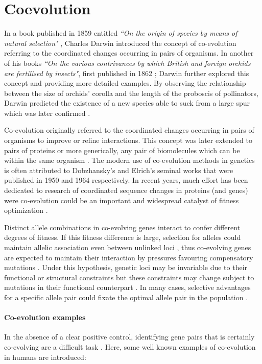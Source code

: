 \section{Coevolution}

In a book published in 1859 entitled \textit{``On the origin of species by means of natural selection"} \cite{darwin1859origin}, Charles Darwin introduced the concept of co-evolution referring to the coordinated changes occurring in pairs of organisms.
In another of his books \textit{``On the various contrivances by which British and foreign orchids are fertilised by insects"}, first published in 1862  \cite{darwin1877various}; Darwin further explored this concept and providing more detailed examples.
By observing the relationship between the size of orchids' corolla and the length of the proboscis of pollinators, Darwin predicted the existence of a new species able to suck from a large spur  which was later confirmed \cite{de2013emerging}.

Co‐evolution originally referred to the coordinated changes occurring in pairs of organisms to improve or refine interactions.
This concept was later extended to pairs of proteins or more generically, any pair of biomolecules which can be within the same organism \cite{de2013emerging}.
The modern use of co-evolution methods in genetics is often attributed to Dobzhansky's \cite{dobzhansky1950genetics} and Elrich's \cite{ehrlich1964butterflies} seminal works that were published in 1950 and 1964 respectively.
In recent years, much effort has been dedicated to research of coordinated sequence changes in proteins (and genes) were co‐evolution could be an important and widespread catalyst of fitness optimization \cite{de2013emerging}.

Distinct allele combinations in co-evolving genes interact to confer different degrees of fitness. 
If this fitness difference is large, selection for alleles could maintain allelic association even between unlinked loci \cite{rohlfs2010detecting}, thus co-evolving genes are expected to maintain their interaction by pressures favouring compensatory mutations \cite{rohlfs2010detecting}.
Under this hypothesis, genetic loci may be invariable due to their functional or structural constraints but these constraints may change subject to mutations in their functional counterpart \cite{fares2006novel}.
In many cases, selective advantages for a specific allele pair could fixate the optimal allele pair in the population \cite{rohlfs2010detecting}.

\paragraph{Co-evolution examples}
In the absence of a clear positive control, identifying gene pairs that is certainly co-evolving are a difficult task \cite{rohlfs2010detecting}.
Here, some well known examples of co-evolution in humans are introduced:

